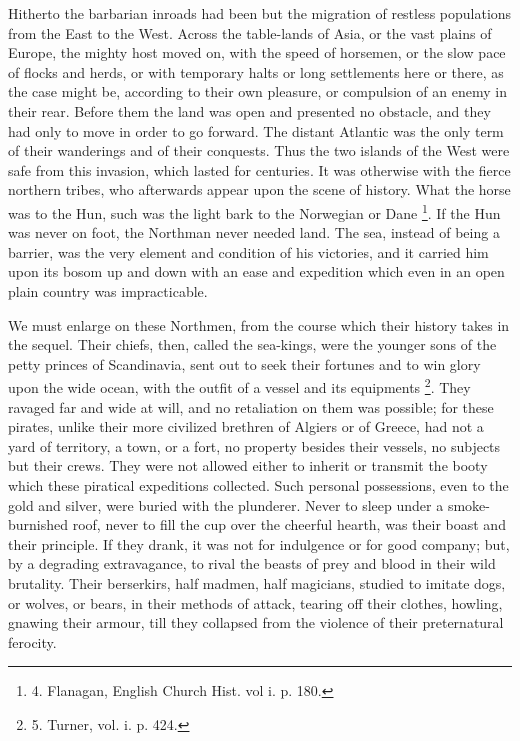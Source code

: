 Hitherto the barbarian inroads
had been but the migration of restless populations from the East to
the West. Across the table-lands of Asia, or the vast plains of
Europe, the mighty host moved on, with the speed of horsemen, or the
slow pace of flocks and herds, or with temporary halts or long
settlements here or there, as the case might be, according to their
own pleasure, or compulsion of an enemy in their rear. Before them the
land was open and presented no obstacle, and they had only to move in
order to go forward. The distant Atlantic was the only term of their
wanderings and of their conquests. Thus the two islands of the West
were safe from this invasion, which lasted for centuries. It was otherwise with the fierce northern tribes, who afterwards appear upon
the scene of history. What the horse was to the Hun, such was the
light bark to the Norwegian or Dane \footnote{4.
Flanagan, English Church Hist. vol i. p. 180.}. If the Hun was never on foot, the Northman never needed land.
The sea, instead of being a barrier, was the very element and
condition of his victories, and it carried him upon its bosom up and
down with an ease and expedition which even in an open plain country
was impracticable.

We must enlarge on these
Northmen, from the course which their history takes in the sequel.
Their chiefs, then, called the sea-kings, were the younger sons of the
petty princes of Scandinavia, sent out to seek their fortunes and to
win glory upon the wide ocean, with the outfit of a vessel and its
equipments \footnote{5.
Turner, vol. i. p. 424.}. They ravaged
far and wide at will, and no retaliation on them was possible; for
these pirates, unlike their more civilized brethren of Algiers or of
Greece, had not a yard of territory, a town, or a fort, no property
besides their vessels, no subjects but their crews. They were not
allowed either to inherit or transmit the booty which these piratical
expeditions collected. Such personal possessions, even to the gold and
silver, were buried with the plunderer. Never to sleep under a
smoke-burnished roof, never to fill the cup over the cheerful hearth,
was their boast and their principle. If they drank, it was not for
indulgence or for good company; but, by a degrading extravagance, to
rival the beasts of prey and blood in their wild brutality. Their
berserkirs, half madmen, half magicians, studied to imitate dogs, or
wolves, or bears, in their methods of attack, tearing off their
clothes, howling, gnawing their armour, till they collapsed from the
violence of their preternatural ferocity.


